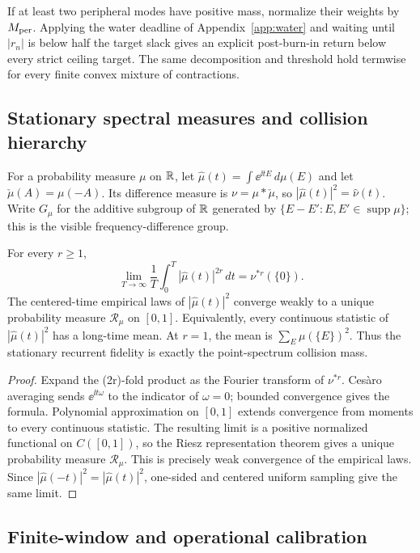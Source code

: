 If at least two peripheral modes have positive mass, normalize their weights
by $M_{\rm per}$.  Applying the water deadline of Appendix~\ref{app:water} and waiting
until $|r_n|$ is below half the target slack gives an explicit post-burn-in
return below every strict ceiling target.  The same decomposition and
threshold hold termwise for every finite convex mixture of contractions.

\subsection{Stationary spectral measures and collision hierarchy}

For a probability measure $\mu$ on $\mathbb R$, let
$\widehat\mu(t)=\int\ee^{\ii tE}\,d\mu(E)$ and let
$\check\mu(A)=\mu(-A)$.  Its difference measure is
$\nu=\mu*\check\mu$, so
$|\widehat\mu(t)|^2=\widehat\nu(t)$.
Write $G_\mu$ for the additive subgroup of $\mathbb R$ generated by
$\{E-E':E,E'\in\operatorname{supp}\mu\}$; this is the visible
frequency-difference group.

\begin{theorem}
For every $r\ge1$,
\[
 \lim_{T\to\infty}\frac1T\int_0^T
   |\widehat\mu(t)|^{2r}\,dt
 =\nu^{*r}(\{0\}).
\]
The centered-time empirical laws of $|\widehat\mu(t)|^2$ converge weakly to
a unique probability measure $\mathscr R_\mu$ on $[0,1]$.  Equivalently,
every continuous statistic of $|\widehat\mu(t)|^2$ has a long-time mean.  At
$r=1$, the mean is
$\sum_E\mu(\{E\})^2$.  Thus the stationary recurrent fidelity is exactly
the point-spectrum collision mass.
\end{theorem}

\begin{proof}
Expand the (2r)-fold product as the Fourier transform of $\nu^{*r}$.
Ces\`aro averaging sends $\ee^{\ii t\omega}$ to the indicator of
$\omega=0$; bounded convergence gives the formula.  Polynomial
approximation on $[0,1]$ extends convergence from moments to every continuous
statistic.  The resulting limit is a positive normalized functional on
$C([0,1])$, so the Riesz representation theorem gives a unique probability
measure $\mathscr R_\mu$.  This is precisely weak convergence of the empirical
laws.  Since $|\widehat\mu(-t)|^2=|\widehat\mu(t)|^2$, one-sided and centered
uniform sampling give the same limit.
\end{proof}

\subsection{Finite-window and operational calibration}

